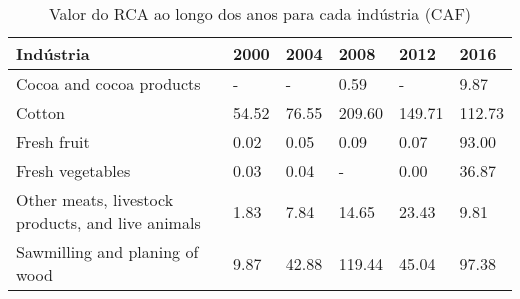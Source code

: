 \begin{table}
\centering
\caption{Valor do RCA ao longo dos anos para cada indústria (CAF)}
\label{tab:ex3-tempo-CAF}
\begin{tabular}{p{6cm}p{1.5cm}p{1.5cm}p{1.5cm}p{1.5cm}p{1.5cm}}
\toprule
                                        Indústria &  2000 &  2004 &   2008 &   2012 &   2016 \\
\midrule
                         Cocoa and cocoa products &     - &     - &   0.59 &      - &   9.87 \\
                                           Cotton & 54.52 & 76.55 & 209.60 & 149.71 & 112.73 \\
                                      Fresh fruit &  0.02 &  0.05 &   0.09 &   0.07 &  93.00 \\
                                 Fresh vegetables &  0.03 &  0.04 &      - &   0.00 &  36.87 \\
Other meats, livestock products, and live animals &  1.83 &  7.84 &  14.65 &  23.43 &   9.81 \\
                   Sawmilling and planing of wood &  9.87 & 42.88 & 119.44 &  45.04 &  97.38 \\
\bottomrule
\end{tabular}
\end{table}

